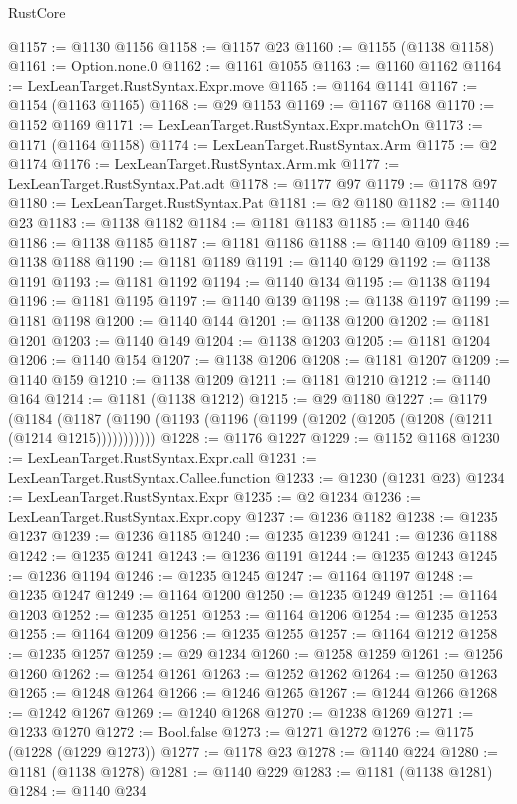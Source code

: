 \begin{lexlean}{RustCore}
\begin{coremodule}
@1157 := @1130 @1156
@1158 := @1157 @23
@1160 := @1155 (@1138 @1158)
@1161 := Option.none.{0}
@1162 := @1161 @1055
@1163 := @1160 @1162
@1164 := LexLeanTarget.RustSyntax.Expr.move
@1165 := @1164 @1141
@1167 := @1154 (@1163 @1165)
@1168 := @29 @1153
@1169 := @1167 @1168
@1170 := @1152 @1169
@1171 := LexLeanTarget.RustSyntax.Expr.matchOn
@1173 := @1171 (@1164 @1158)
@1174 := LexLeanTarget.RustSyntax.Arm
@1175 := @2 @1174
@1176 := LexLeanTarget.RustSyntax.Arm.mk
@1177 := LexLeanTarget.RustSyntax.Pat.adt
@1178 := @1177 @97
@1179 := @1178 @97
@1180 := LexLeanTarget.RustSyntax.Pat
@1181 := @2 @1180
@1182 := @1140 @23
@1183 := @1138 @1182
@1184 := @1181 @1183
@1185 := @1140 @46
@1186 := @1138 @1185
@1187 := @1181 @1186
@1188 := @1140 @109
@1189 := @1138 @1188
@1190 := @1181 @1189
@1191 := @1140 @129
@1192 := @1138 @1191
@1193 := @1181 @1192
@1194 := @1140 @134
@1195 := @1138 @1194
@1196 := @1181 @1195
@1197 := @1140 @139
@1198 := @1138 @1197
@1199 := @1181 @1198
@1200 := @1140 @144
@1201 := @1138 @1200
@1202 := @1181 @1201
@1203 := @1140 @149
@1204 := @1138 @1203
@1205 := @1181 @1204
@1206 := @1140 @154
@1207 := @1138 @1206
@1208 := @1181 @1207
@1209 := @1140 @159
@1210 := @1138 @1209
@1211 := @1181 @1210
@1212 := @1140 @164
@1214 := @1181 (@1138 @1212)
@1215 := @29 @1180
@1227 := @1179
    (@1184 (@1187 (@1190 (@1193 (@1196 (@1199 (@1202 (@1205 (@1208 (@1211 (@1214 @1215)))))))))))
@1228 := @1176 @1227
@1229 := @1152 @1168
@1230 := LexLeanTarget.RustSyntax.Expr.call
@1231 := LexLeanTarget.RustSyntax.Callee.function
@1233 := @1230 (@1231 @23)
@1234 := LexLeanTarget.RustSyntax.Expr
@1235 := @2 @1234
@1236 := LexLeanTarget.RustSyntax.Expr.copy
@1237 := @1236 @1182
@1238 := @1235 @1237
@1239 := @1236 @1185
@1240 := @1235 @1239
@1241 := @1236 @1188
@1242 := @1235 @1241
@1243 := @1236 @1191
@1244 := @1235 @1243
@1245 := @1236 @1194
@1246 := @1235 @1245
@1247 := @1164 @1197
@1248 := @1235 @1247
@1249 := @1164 @1200
@1250 := @1235 @1249
@1251 := @1164 @1203
@1252 := @1235 @1251
@1253 := @1164 @1206
@1254 := @1235 @1253
@1255 := @1164 @1209
@1256 := @1235 @1255
@1257 := @1164 @1212
@1258 := @1235 @1257
@1259 := @29 @1234
@1260 := @1258 @1259
@1261 := @1256 @1260
@1262 := @1254 @1261
@1263 := @1252 @1262
@1264 := @1250 @1263
@1265 := @1248 @1264
@1266 := @1246 @1265
@1267 := @1244 @1266
@1268 := @1242 @1267
@1269 := @1240 @1268
@1270 := @1238 @1269
@1271 := @1233 @1270
@1272 := Bool.false
@1273 := @1271 @1272
@1276 := @1175 (@1228 (@1229 @1273))
@1277 := @1178 @23
@1278 := @1140 @224
@1280 := @1181 (@1138 @1278)
@1281 := @1140 @229
@1283 := @1181 (@1138 @1281)
@1284 := @1140 @234

\end{coremodule}
\end{lexlean}
